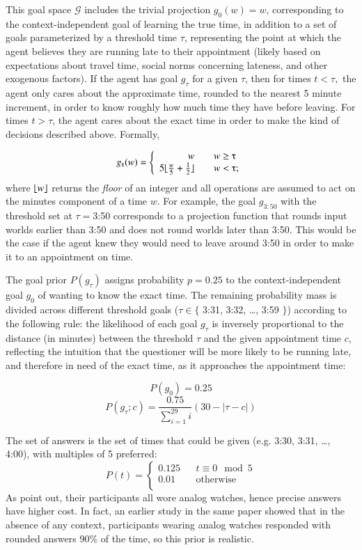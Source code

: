 \documentclass[12pt, floatsintext, jou]{apa6}
\begin{document}
This goal space $\mathcal{G}$ includes the trivial projection $g_0(w) = w$, corresponding to the context-independent goal of learning the true time, in addition to a set of goals parameterized by a threshold time $\tau$, representing the point at which the agent believes they are running late to their appointment (likely based on expectations about travel time, social norms concerning lateness, and other exogenous factors). If the agent has goal $g_\tau$ for a given $\tau$, then for times $t < \tau,$ the agent only cares about the approximate time, rounded to the nearest 5 minute increment, in order to know roughly how much time they have before leaving. For times $t > \tau$, the agent cares about the exact time in order to make the kind of decisions described above. Formally,

\DeclarePairedDelimiter{\floor}{\lfloor}{\rfloor}

$$g_\tau(w) = \left\{
\begin{array}{rcl}
w & & w \ge \tau\\
5\floor{\frac{w}{5} + \frac{1}{2}} & & w < \tau;  \\
\end{array}
\right.
$$
where $\floor{w}$ returns the \emph{floor} of an integer and all operations are assumed to act on the minutes component of a time $w$. For example, the goal $g_{3:50}$ with the threshold set at $\tau = $3:50 corresponds to a projection function that rounds input worlds earlier than 3:50 and does not round worlds later than 3:50. This would be the case if the agent knew they would need to leave around 3:50 in order to make it to an appointment on time. 

The goal prior $P(g_\tau)$ assigns probability $p=0.25$ to the context-independent goal $g_0$ of wanting to know the exact time. The remaining probability mass is divided across different threshold goals ($\tau \in \{$ 3:31, 3:32, \dots, 3:59 $\}$) according to the following rule: the likelihood of each goal $g_\tau$ is inversely proportional to the distance (in minutes) between the threshold $\tau$ and the given appointment time $c$, reflecting the intuition that the questioner will be more likely to be running late, and therefore in need of the exact time, as it approaches the appointment time:

$$P(g_0) = 0.25$$
$$P(g_\tau; c) = \frac{0.75}{\sum_{i=1}^{29}i}(30 - |\tau - c|)$$

The set of answers is the set of times that could be given (e.g. 3:30, 3:31, \dots, 4:00), with multiples of 5 preferred:
$$P(t) = \left\{
\begin{array}{lcl}
0.125 & & t \equiv 0 \mod 5 \\
0.01 & & \textrm{otherwise} \\
\end{array}
\right.
$$ As  point out, their participants all wore analog watches, hence precise answers have higher cost. In fact, an earlier study in the same paper showed that in the absence of any context, participants wearing analog watches responded with rounded answers 90\% of the time, so this prior is realistic. 
\end{document}
